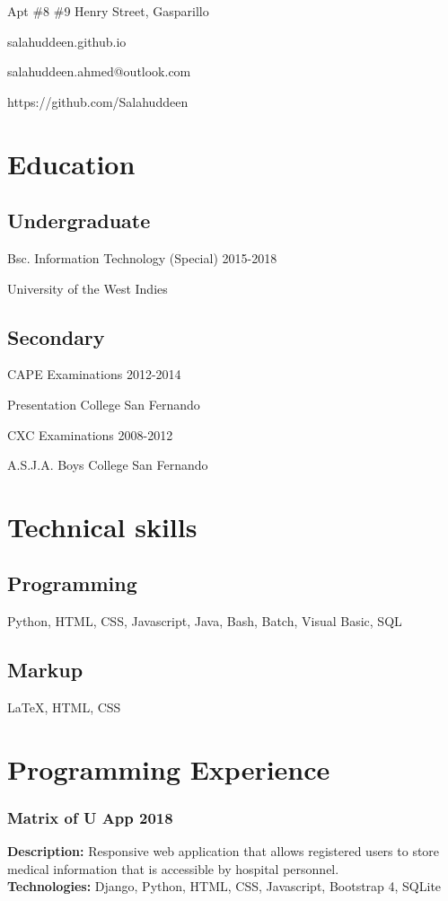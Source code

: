 \documentclass{article}
\makeatletter
\renewcommand{\maketitle}{
\begin{center}
{\huge\bfseries
\theauthor}
\vspace{.25em}

Apt \#8 \#9 Henry Street, Gasparillo

salahuddeen.github.io

salahuddeen.ahmed@outlook.com

https://github.com/Salahuddeen


\end{center}
}
\makeatother
\begin{document}
\author{Salahuddeen Ahmed}

\maketitle

\section {Education}
\subsection{Undergraduate}
Bsc. Information Technology (Special) \hfill{2015-2018}

\hspace{10mm}University of the West Indies

\subsection{Secondary}
CAPE Examinations \hfill {2012-2014}

\hspace{10mm} Presentation College San Fernando

CXC Examinations \hfill {2008-2012}

\hspace{10mm}A.S.J.A. Boys College San Fernando
\section{Technical skills}

\subsection{Programming}
Python, HTML, CSS, Javascript, Java, Bash, Batch, Visual Basic, SQL

\subsection{Markup}
{\LaTeX}, HTML, CSS

\section{Programming Experience}

\subsubsection{Matrix of U App \hfill{2018}} 
{\bfseries Description:} Responsive web application that allows registered users to store medical information that is accessible by hospital personnel.
\\{\bfseries Technologies:} Django, Python, HTML, CSS, Javascript, Bootstrap 4, SQLite
\end{document}
